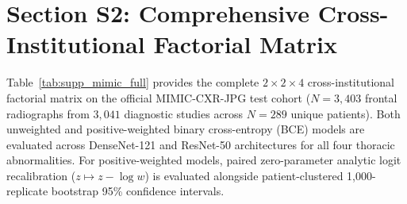 \documentclass[preprint,12pt]{elsarticle}
\begin{document}
\section*{Section S2: Comprehensive Cross-Institutional Factorial Matrix}
Table~\ref{tab:supp_mimic_full} provides the complete $2 \times 2 \times 4$ cross-institutional factorial matrix on the official MIMIC-CXR-JPG test cohort ($N = 3,403$ frontal radiographs from $3,041$ diagnostic studies across $N = 289$ unique patients). Both unweighted and positive-weighted binary cross-entropy (BCE) models are evaluated across DenseNet-121 and ResNet-50 architectures for all four thoracic abnormalities. For positive-weighted models, paired zero-parameter analytic logit recalibration ($z \mapsto z - \log w$) is evaluated alongside patient-clustered 1,000-replicate bootstrap 95\% confidence intervals.
\end{document}
